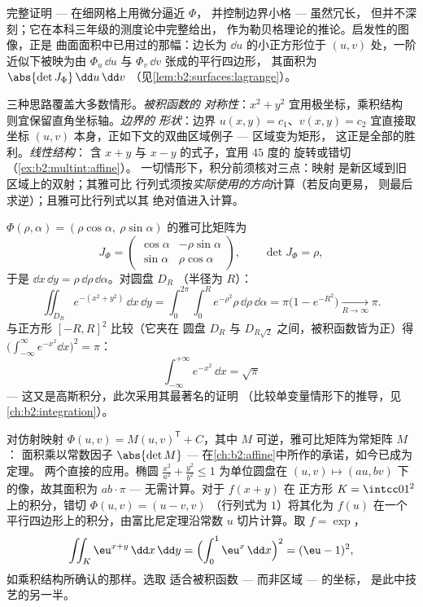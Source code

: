 \begin{remark}
完整证明 --- 在细网格上用微分逼近 $\Phi$，
并控制边界小格 --- 虽然冗长，
但并不深刻；它在本科三年级的测度论中完整给出，
作为勒贝格理论的推论。启发性的图像，正是
曲面面积中已用过的那幅：边长为 $\dd u$ 的小正方形位于
$(u, v)$ 处，一阶近似下被映为由 $\Phi_u\,\dd u$ 与 $\Phi_v\,\dd v$ 张成的平行四边形，
其面积为
$\abs{\det J_\Phi}\,\dd u\,\dd v$
（见\cref{lem:b2:surfaces:lagrange}）。
\end{remark}

\begin{remark}[方法：选取变量替换]
三种思路覆盖大多数情形。\emph{被积函数的
对称性}：$x^2 + y^2$ 宜用极坐标，乘积结构
则宜保留直角坐标轴。\emph{边界的
形状}：边界 $u(x,y) = c_1$、$v(x,y) = c_2$ 宜直接取
坐标 $(u, v)$ 本身，正如下文的双曲区域例子 ---
区域变为矩形，
这正是全部的胜利。\emph{线性结构}：
含 $x + y$ 与 $x - y$ 的式子，宜用 $45$ 度的
旋转或错切（\cref{ex:b2:multint:affine}）。
一切情形下，积分前须核对三点：映射
是新区域到旧区域上的双射；其雅可比
行列式须按\emph{实际使用的方向}计算（若反向更易，
则最后求逆）；且雅可比行列式以其
绝对值进入计算。
\end{remark}

\begin{example}[极坐标]\label{ex:b2:multint:polar}
$\Phi(\rho, \alpha) = (\rho\cos\alpha,\ \rho\sin\alpha)$ 的雅可比矩阵为
\[
J_\Phi = \begin{pmatrix}
\cos\alpha & -\rho\sin\alpha\\
\sin\alpha & \rho\cos\alpha
\end{pmatrix},
\qquad \det J_\Phi = \rho ,
\]
于是 $\dd x\,\dd y = \rho\,\dd\rho\,\dd\alpha$。对圆盘 $D_R$
（半径为 $R$）：
\[
\iint_{D_R} e^{-(x^2 + y^2)}\,\dd x\,\dd y
= \int_0^{2\pi}\!\!\int_0^R e^{-\rho^2}\rho\,\dd\rho\,\dd\alpha
= \pi\bigl(1 - e^{-R^2}\bigr)
\xrightarrow[R\to\infty]{} \pi .
\]
与正方形 $[-R, R]^2$ 比较（它夹在
圆盘 $D_R$ 与 $D_{R\sqrt2}$ 之间，被积函数皆为正）得
$\bigl(\int_{-\infty}^\infty e^{-x^2}\dd x\bigr)^2 = \pi$：
\[
\boxed{\ \int_{-\infty}^{+\infty} e^{-x^2}\,\dd x = \sqrt{\pi}\ }
\]
--- 这又是高斯积分，此次采用其最著名的证明
（比较单变量情形下的推导，见
\cref{ch:b2:integration}）。
\end{example}

\begin{example}[仿射变量替换]\label{ex:b2:multint:affine}
对仿射映射 $\Phi(u, v) = M(u, v)^{\mathsf T} + C$，其中
$M$ 可逆，雅可比矩阵为常矩阵 $M$：
面积乘以常数因子 $\abs{\det M}$
--- 在\cref{ch:b2:affine}中所作的承诺，如今已成为定理。
两个直接的应用。椭圆 $\frac{x^2}{a^2} +
\frac{y^2}{b^2} \leq 1$ 为单位圆盘在
$(u, v) \mapsto (au, bv)$ 下的像，故其面积为 $ab \cdot \pi$ ---
无需计算。对于 $f(x + y)$ 在
正方形 $K = \intcc01^2$ 上的积分，错切 $\Phi(u, v) = (u - v, v)$
（行列式为 $1$）将其化为 $f(u)$ 在一个
平行四边形上的积分，由富比尼定理沿常数 $u$ 切片计算。取 $f =
\exp$，
\[
\iint_K \eu^{x+y}\,\dd x\,\dd y
= \Bigl(\int_0^1 \eu^x\,\dd x\Bigr)^2 = (\eu - 1)^2,
\]
如乘积结构所确认的那样。选取
适合被积函数 --- 而非区域 --- 的坐标，
是此中技艺的另一半。
\end{example}


